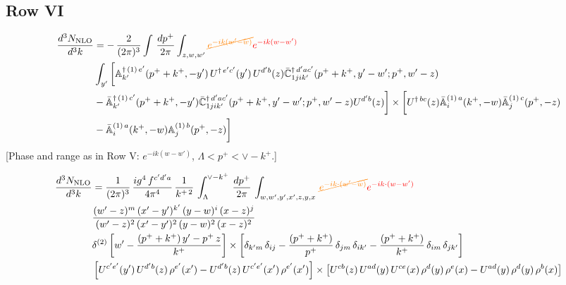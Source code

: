 \documentclass[9pt]{article}
\def\mf#1{\mathbb{#1}}
\numberwithin{equation}{section}
\begin{document}
\subsection{Row VI\,}
\begin{align}
     \frac{d^{3}N_{\rm NLO}}{d^{3}k} & =  -\, \frac{2}{(2\pi)^{3}} \int\, \frac{dp^{+}}{2\pi}\int_{z,w,w^{\prime}} {\color{orange}\cancel{e^{-ik(w^{\prime}-w)}}}{\color{red}e^{-ik(w-w^{\prime})}}\, \notag \\ & \int_{y^{\prime}}\bigg[\mf{A}^{\dagger\, (1)\,e^{\prime}}_{k^{\prime}}(p^{+}+k^{+},-y^{\prime})\,U^{\dagger\, e^{\prime}c^{\prime}}(y^{\prime})\,U^{d^{\prime}b}(z) \Bar{\mf{C}}^{\dagger\, d^{\prime}ac^{\prime}}_{1jik^{\prime}}(p^{+}+k^{+},y^{\prime}-w^{\prime}; p^{+},w^{\prime}-z) \notag \\ & -\Bar{\mf{A}}^{\dagger\, (1)\,c^{\prime}}_{k^{\prime}}(p^{+}+k^{+},-y^{\prime})\Bar{\mf{C}}^{\dagger\, d^{\prime}ac^{\prime}}_{1jik^{\prime}}(p^{+}+k^{+},y^{\prime}-w^{\prime}; p^{+},w^{\prime}-z)U^{d^{\prime}b}(z)\bigg] \times \bigg[U^{\dagger\,bc}(z)\Bar{\mf{A}}^{(1)\, a}_{i}(k^{+},- w)\Bar{\mf{A}}^{(1)\, c}_{j}(p^{+},-z)\notag \\ & -\Bar{\mf{A}}^{(1)\, a}_{i}(k^{+},- w) \mf{A}^{(1)\, b}_{j}(p^{+},- z)\bigg]\nonumber
\end{align} {\color{red}[Phase and range as in Row V: $e^{-ik(w-w')}$, $\Lambda<p^{+}<\vee-k^{+}$.]}\par\noindent 
\begin{align}
     \frac{d^{3}N_{\rm NLO}}{d^{3}k} & =  \frac{1}{(2\pi)^{3}}\,\frac{ig^{4}\,f^{c'd'a}}{4\pi^{4}}\, \frac{1}{k^{+\,2}}\,\int_{\Lambda}^{\vee-k^{+}}\, \frac{dp^{+}}{2\pi}\, \int_{w,w',y',x',z,y,x}\, {\color{orange}\cancel{e^{-ik\cdot (w'-w)}}}{\color{red}e^{-ik\cdot (w-w')}}\, \notag \\ & \frac{(w'-z)^{m}\,(x'-y')^{k'}\,(y-w)^{i}\,(x-z)^{j}}{(w'-z)^{2}\,(x'-y')^{2}\,(y-w)^{2}\,(x-z)^{2}}\notag \\ & \delta^{(2)}\left[w'-\frac{(p^{+}+k^{+})\,y'-p^{+}\,z}{k^{+}}\right]\times \left[\delta_{k'm}\,\delta_{ij}-\frac{(p^{+}+k^{+})}{p^{+}}\,\delta_{jm}\,\delta_{ik'}-\frac{(p^{+}+k^{+})}{k^{+}}\, \delta_{im}\, \delta_{jk'}\right]\notag \\ & \left[U^{c'e'}(y')\,U^{d'b}(z)\,\rho^{e'}(x')-U^{d'b}(z)\,U^{c'e'}(x')\,\rho^{e'}(x')\right]\times \left[U^{cb}(z)\,U^{ad}(y)\,U^{ce}(x)\,\rho^{d}(y)\,\rho^{e}(x)-U^{ad}(y)\,\rho^{d}(y)\,\rho^{b}(x)\right]
\end{align}
\end{document}
